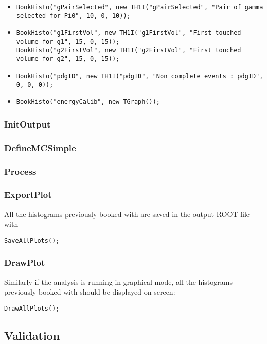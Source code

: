 \begin{itemize}
\begin{lstlisting}
\end{lstlisting}
	\item 
\begin{lstlisting}
BookHisto("gPairSelected", new TH1I("gPairSelected", "Pair of gamma selected for Pi0", 10, 0, 10));
\end{lstlisting}
	\item 
\begin{lstlisting}
BookHisto("g1FirstVol", new TH1I("g1FirstVol", "First touched volume for g1", 15, 0, 15));
BookHisto("g2FirstVol", new TH1I("g2FirstVol", "First touched volume for g2", 15, 0, 15));
\end{lstlisting}
	\item 
\begin{lstlisting}
BookHisto("pdgID", new TH1I("pdgID", "Non complete events : pdgID", 0, 0, 0));
\end{lstlisting}
	\item 
\begin{lstlisting}
BookHisto("energyCalib", new TGraph());
\end{lstlisting}
\end{itemize}

\subsubsection{InitOutput}

\subsubsection{DefineMCSimple}

\subsubsection{Process}

\subsubsection{ExportPlot}
All the histograms previously booked with  are saved in the output ROOT file with

\begin{lstlisting}
SaveAllPlots();
\end{lstlisting} 

\subsubsection{DrawPlot}
Similarly if the analysis is running in graphical mode, all the histograms previously booked with
 should be displayed on screen:

\begin{lstlisting}
DrawAllPlots();
\end{lstlisting} 

\subsection{Validation}
